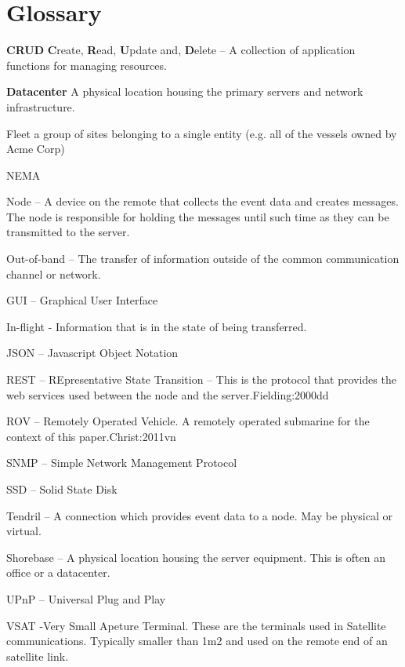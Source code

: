 \chapter{Glossary}
\textbf{CRUD}        \textbf{C}reate, \textbf{R}ead, \textbf{U}pdate and, \textbf{D}elete – A collection of application functions for managing resources. 

\textbf{Datacenter}      A physical location housing the primary servers and network infrastructure.

Fleet       a group of sites belonging to a single entity (e.g. all of the vessels owned  by Acme Corp)

NEMA         

Node – A device on the remote that collects the event data and creates messages. The node is responsible for holding the messages until such time as they can be transmitted to the server.

Out-of-band	– The transfer of information outside of the common communication channel or network.

GUI – Graphical User Interface

In-flight	- Information that is in the state of being transferred.

JSON – Javascript Object Notation

REST – REpresentative State Transition – This is the protocol that provides the web services used between the node and the server.{Fielding:2000dd}

ROV – Remotely Operated Vehicle. A remotely operated submarine for the context of this paper.{Christ:2011vn}

SNMP – Simple Network Management Protocol

SSD – Solid State Disk

Tendril – A connection which provides event data to a node. May be physical or virtual.

Shorebase – A physical location housing the server equipment. This is often an office or a datacenter.

UPnP – Universal Plug and Play

VSAT	-Very Small Apeture Terminal. These are the terminals used in Satellite communications. Typically smaller than 1m2 and used on the remote end of an satellite link.
